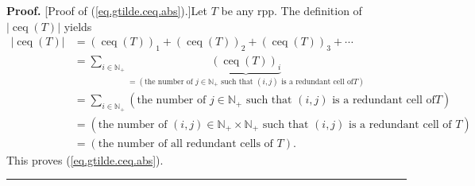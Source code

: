 \documentclass[numbers=enddot,12pt,final,onecolumn,notitlepage]{scrartcl}%
\theoremstyle{definition}
\newenvironment{proof}[1][Proof]{\noindent\textbf{#1.} }{\ \rule{0.5em}{0.5em}}
\newenvironment{verlong}{}{}
\let\sumnonlimits\sum
\renewcommand{\sum}{\sumnonlimits\limits}
\begin{document}
\begin{verlong}
\begin{proof}
[Proof of (\ref{eq.gtilde.ceq.abs}).]Let $T$ be any rpp. The definition of
$\left\vert \operatorname*{ceq}\left(  T\right)  \right\vert $ yields%
\begin{align*}
\left\vert \operatorname*{ceq}\left(  T\right)  \right\vert  &  =\left(
\operatorname*{ceq}\left(  T\right)  \right)  _{1}+\left(  \operatorname*{ceq}%
\left(  T\right)  \right)  _{2}+\left(  \operatorname*{ceq}\left(  T\right)
\right)  _{3}+\cdots\\
&  =\sum_{i\in\mathbb{N}_{+}}\underbrace{\left(  \operatorname*{ceq}\left(
T\right)  \right)  _{i}}_{=\left(  \text{the number of }j\in\mathbb{N}%
_{+}\text{ such that }\left(  i,j\right)  \text{ is a redundant cell of
}T\right)  }\\
&  =\sum_{i\in\mathbb{N}_{+}}\left(  \text{the number of }j\in\mathbb{N}%
_{+}\text{ such that }\left(  i,j\right)  \text{ is a redundant cell of
}T\right) \\
&  =\left(  \text{the number of }\left(  i,j\right)  \in\mathbb{N}_{+}%
\times\mathbb{N}_{+}\text{ such that }\left(  i,j\right)  \text{ is a redundant
cell of }T\right) \\
&  =\left(  \text{the number of all redundant cells of }T\right)  .
\end{align*}
This proves (\ref{eq.gtilde.ceq.abs}).
\end{proof}
\end{verlong}
\end{document}
